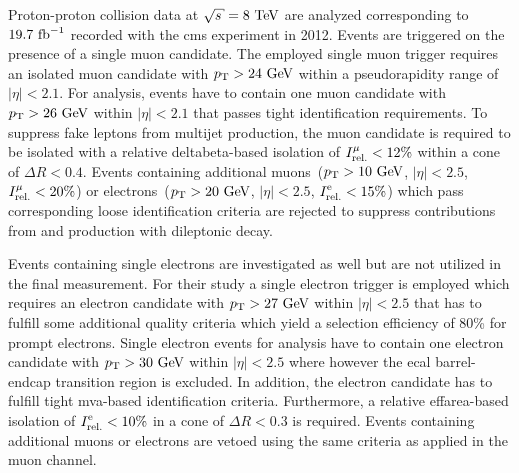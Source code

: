 Proton-proton collision data at $\sqrt{s}=8~\TeV$ are analyzed corresponding to $19.7~\invfb$ recorded with the \gls{cms} experiment in 2012. Events are triggered on the presence of a single muon candidate. The employed single muon trigger requires an isolated muon candidate with $p_\textrm{T}>24~\textrm{GeV}$ within a pseudorapidity range of $|\eta|<2.1$.  For analysis, events have to contain one muon candidate with $p_\textrm{T}>26~\textrm{GeV}$ within $|\eta|<2.1$ that passes tight identification requirements. To suppress fake leptons from multijet production, the muon candidate is required to be isolated with a relative \gls{deltabeta}-based isolation of $\muiso<12\%$ within a cone of $\Delta R<0.4$. Events containing additional muons~($p_\textrm{T}>10~\textrm{GeV}$, $|\eta|<2.5$, $\muiso<20\%$) or electrons~($p_\textrm{T}>20~\textrm{GeV}$, $|\eta|<2.5$, $\eiso<15\%$) which pass corresponding loose identification criteria are rejected to suppress contributions from \zjets and \ttbar production with dileptonic decay. 

Events containing single electrons are investigated as well but are not utilized in the final measurement. For their study a single electron trigger is employed which requires an electron candidate with $p_\textrm{T}>27~\textrm{GeV}$ within $|\eta|<2.5$ that has to fulfill some additional quality criteria which yield a selection efficiency of 80\% for prompt electrons. Single electron events for analysis have to contain one electron candidate with $p_\textrm{T}>30~\textrm{GeV}$ within $|\eta|<2.5$ where however the \gls{ecal} barrel-endcap transition region is excluded. In addition, the electron candidate has to fulfill tight \gls{mva}-based identification criteria. Furthermore, a relative \gls{effarea}-based isolation of $\eiso<10\%$ in a cone of $\Delta R <0.3$ is required. Events containing additional muons or electrons are vetoed using the same criteria as applied in the muon channel.

